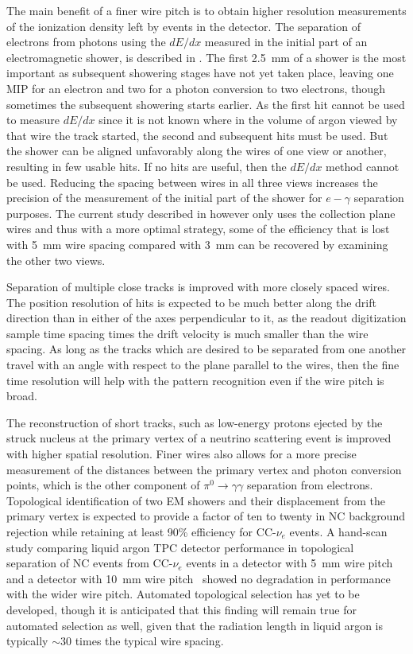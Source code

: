 The main benefit of a finer wire pitch is to obtain higher resolution measurements of the
ionization density left by events in the detector.  The separation of electrons from
photons using the $dE/dx$ measured in the initial part of an electromagnetic shower, is
described in \anxreco.  The first 2.5~mm of a shower is the most important as subsequent
showering stages have not yet taken place, leaving one MIP for an electron and two for a photon
conversion to two electrons, though sometimes the subsequent showering starts earlier.
As the first hit cannot be used to measure $dE/dx$ since it is not known where in the volume
of argon viewed by that wire the track started, the second and subsequent hits must be used.
But the shower can be aligned unfavorably along the wires of one view or another, resulting
in few usable hits.  If no hits are useful, then the $dE/dx$ method cannot be used.  Reducing
the spacing between wires in all three views increases the precision of the measurement of the
initial part of the shower for $e-\gamma$ separation purposes.  The current study described
in \anxreco however only uses the collection plane wires and thus with a more optimal strategy,
some of the efficiency that is lost with 5~mm wire spacing compared with 3~mm can be recovered
by examining the other two views.

Separation of multiple close tracks
is improved with more closely spaced wires.  The position resolution of hits
is expected to be much better along the drift direction than in either of the axes perpendicular
to it, as the readout digitization sample time spacing times the drift velocity is much smaller
than the wire spacing.  As long as the tracks which are desired to be separated from one another
travel with an angle with respect to the plane parallel to the wires, then the fine time resolution
will help with the pattern recognition even if the wire pitch is broad.

The reconstruction of short tracks, such as low-energy
protons ejected by the struck nucleus at the primary vertex of a neutrino scattering event
is improved with higher spatial resolution.  Finer wires also allows for a more precise measurement
of the distances between the primary vertex and photon conversion points, which is the other
component of $\pi^0\rightarrow\gamma\gamma$ separation from electrons.  Topological
identification of two EM showers and their displacement from the primary vertex is expected
to provide a factor of ten to twenty in NC background rejection while retaining at least 90\%
efficiency for CC-$\nu_e$ events.  A hand-scan study comparing liquid argon TPC detector performance
in topological separation of NC events from CC-$\nu_e$ events in a detector with 5~mm wire pitch
and a detector with 10~mm wire pitch~\cite{2008-hand-scan} showed no degradation in performance with
the wider wire pitch.  Automated topological selection has yet to be developed, though it is
anticipated that this finding will remain true for automated selection as well, given that the
radiation length in liquid argon is typically $\sim$30 times the typical wire spacing.

